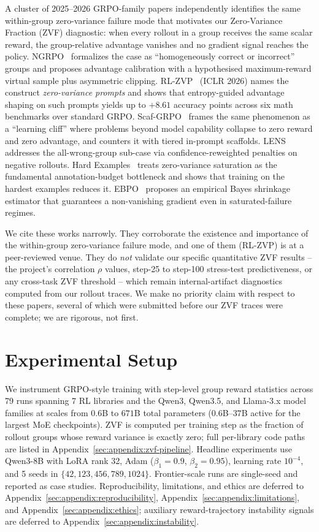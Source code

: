 \documentclass{article}
\begin{document}
A cluster of 2025--2026 GRPO-family papers independently identifies the same
within-group zero-variance failure mode that motivates our Zero-Variance
Fraction (ZVF) diagnostic: when every rollout in a group receives the same
scalar reward, the group-relative advantage vanishes and no gradient signal
reaches the policy. NGRPO~\cite{nan2025ngrpo} formalizes the case as
``homogeneously correct or incorrect'' groups and proposes advantage
calibration with a hypothesised maximum-reward virtual sample plus asymmetric
clipping. RL-ZVP~\cite{le2025rlzvp} (ICLR 2026) names the construct
\emph{zero-variance prompts} and shows that entropy-guided advantage shaping
on such prompts yields up to $+8.61$ accuracy points across six math
benchmarks over standard GRPO. Scaf-GRPO~\cite{zhang2025scaffgrpo} frames the
same phenomenon as a ``learning cliff'' where problems beyond model capability
collapse to zero reward and zero advantage, and counters it with tiered
in-prompt scaffolds. LENS~\cite{feng2025lens} addresses the all-wrong-group
sub-case via confidence-reweighted penalties on negative rollouts. Hard
Examples~\cite{pikus2025hardexamples} treats zero-variance saturation as the
fundamental annotation-budget bottleneck and shows that training on the
hardest examples reduces it. EBPO~\cite{han2026ebpo} proposes an empirical
Bayes shrinkage estimator that guarantees a non-vanishing gradient even in
saturated-failure regimes.

We cite these works narrowly. They corroborate the existence and importance of
the within-group zero-variance failure mode, and one of them (RL-ZVP) is at a
peer-reviewed venue. They do \emph{not} validate our specific quantitative
ZVF results -- the project's correlation $\rho$ values, step-25 to step-100
stress-test predictiveness, or any cross-task ZVF threshold -- which remain
internal-artifact diagnostics computed from our rollout traces. We make no
priority claim with respect to these papers, several of which were submitted
before our ZVF traces were complete; we are rigorous, not first.

 
\section{Experimental Setup}
\label{sec:setup}

We instrument GRPO-style training with step-level group reward statistics
across 79 runs spanning 7 RL libraries and the Qwen3, Qwen3.5, and Llama-3.x
model families at scales from $0.6$B to $671$B total parameters
($0.6$B--$37$B active for the largest MoE checkpoints). ZVF is computed per
training step as the fraction of rollout groups whose reward variance is
exactly zero; full per-library code paths are listed in
Appendix~\ref{sec:appendix:zvf-pipeline}. Headline experiments use Qwen3-8B with
LoRA rank 32, Adam ($\beta_1{=}0.9$, $\beta_2{=}0.95$), learning rate
$10^{-4}$, and 5 seeds in $\{42,123,456,789,1024\}$. Frontier-scale runs are
single-seed and reported as case studies. Reproducibility,
limitations, and ethics are deferred to
Appendix~\ref{sec:appendix:reproducibility},
Appendix~\ref{sec:appendix:limitations}, and
Appendix~\ref{sec:appendix:ethics}; auxiliary reward-trajectory instability
signals are deferred to Appendix~\ref{sec:appendix:instability}.
\end{document}
